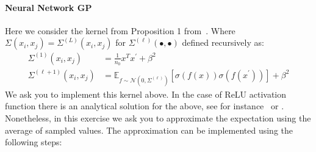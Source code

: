 \documentclass[a4paper,10pt]{article}
\newcounter{exercise}
\begin{document}
\paragraph{Neural Network GP} Here we consider the kernel from Proposition 1 from~\citep{jacot_neural_2018}. Where $\Sigma(x_i, x_j) = \Sigma^{(L)}(x_i, x_j)$ for $\Sigma^{({\ell})}(\bullet, \bullet)$ defined recursively as:
\begin{equation}
\label{eq:nngp_kernel}
\begin{aligned}
\Sigma^{(1)}\left(x_i, x_j\right) &=\frac{1}{n_{0}} x^{T} x^{\prime}+\beta^{2} \\
\Sigma^{(\ell+1)}\left(x_i, x_j\right) &=\mathbb{E}_{f \sim \mathcal{N}\left(0, \Sigma^{(\ell)}\right)}\left[\sigma(f(x)) \sigma\left(f\left(x^{\prime}\right)\right)\right]+\beta^{2}
\end{aligned}
\end{equation}
We ask you to implement this kernel above. In the case of ReLU activation function there is an analytical solution for the above, see for instance~\cite[Appendix C]{lee_wide_2020}
or \cite{cho_kernel_2009}. Nonetheless, in this exercise we ask you to approximate the expectation using the  average of sampled values. The approximation can be implemented using the following steps:
\end{document}
